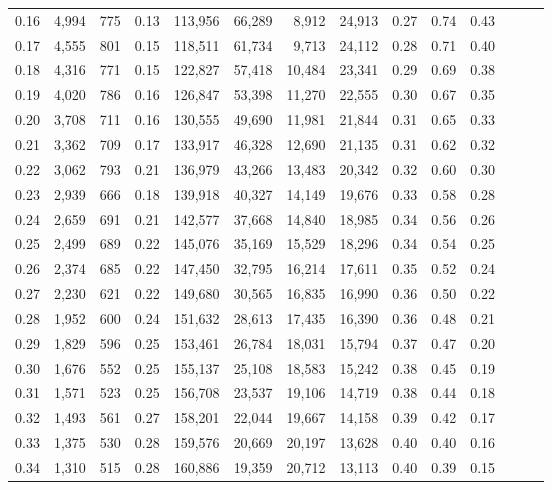 \begin{tabular}{rrrrrrrrrrrrrr}
0.16 &  4,994 &  775 &  0.13 &  113,956 &   66,289 &   8,912 &  24,913 &  0.27 &  0.74 &      0.43 \\
0.17 &  4,555 &  801 &  0.15 &  118,511 &   61,734 &   9,713 &  24,112 &  0.28 &  0.71 &      0.40 \\
0.18 &  4,316 &  771 &  0.15 &  122,827 &   57,418 &  10,484 &  23,341 &  0.29 &  0.69 &      0.38 \\
0.19 &  4,020 &  786 &  0.16 &  126,847 &   53,398 &  11,270 &  22,555 &  0.30 &  0.67 &      0.35 \\
0.20 &  3,708 &  711 &  0.16 &  130,555 &   49,690 &  11,981 &  21,844 &  0.31 &  0.65 &      0.33 \\
0.21 &  3,362 &  709 &  0.17 &  133,917 &   46,328 &  12,690 &  21,135 &  0.31 &  0.62 &      0.32 \\
0.22 &  3,062 &  793 &  0.21 &  136,979 &   43,266 &  13,483 &  20,342 &  0.32 &  0.60 &      0.30 \\
0.23 &  2,939 &  666 &  0.18 &  139,918 &   40,327 &  14,149 &  19,676 &  0.33 &  0.58 &      0.28 \\
0.24 &  2,659 &  691 &  0.21 &  142,577 &   37,668 &  14,840 &  18,985 &  0.34 &  0.56 &      0.26 \\
0.25 &  2,499 &  689 &  0.22 &  145,076 &   35,169 &  15,529 &  18,296 &  0.34 &  0.54 &      0.25 \\
0.26 &  2,374 &  685 &  0.22 &  147,450 &   32,795 &  16,214 &  17,611 &  0.35 &  0.52 &      0.24 \\
0.27 &  2,230 &  621 &  0.22 &  149,680 &   30,565 &  16,835 &  16,990 &  0.36 &  0.50 &      0.22 \\
0.28 &  1,952 &  600 &  0.24 &  151,632 &   28,613 &  17,435 &  16,390 &  0.36 &  0.48 &      0.21 \\
0.29 &  1,829 &  596 &  0.25 &  153,461 &   26,784 &  18,031 &  15,794 &  0.37 &  0.47 &      0.20 \\
0.30 &  1,676 &  552 &  0.25 &  155,137 &   25,108 &  18,583 &  15,242 &  0.38 &  0.45 &      0.19 \\
0.31 &  1,571 &  523 &  0.25 &  156,708 &   23,537 &  19,106 &  14,719 &  0.38 &  0.44 &      0.18 \\
0.32 &  1,493 &  561 &  0.27 &  158,201 &   22,044 &  19,667 &  14,158 &  0.39 &  0.42 &      0.17 \\
0.33 &  1,375 &  530 &  0.28 &  159,576 &   20,669 &  20,197 &  13,628 &  0.40 &  0.40 &      0.16 \\
0.34 &  1,310 &  515 &  0.28 &  160,886 &   19,359 &  20,712 &  13,113 &  0.40 &  0.39 &      0.15 \\

\end{tabular}
